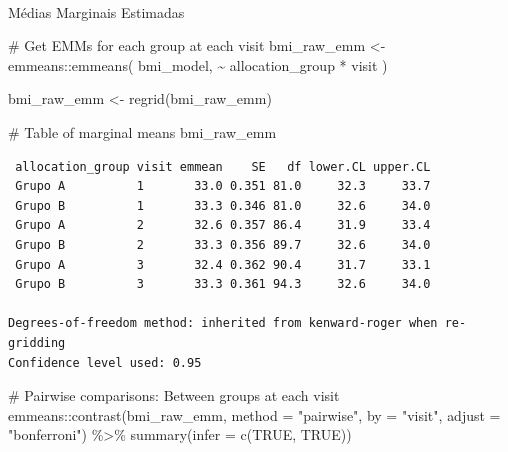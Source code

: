 \documentclass[
  letterpaper,
  DIV=11,
  numbers=noendperiod]{scrartcl}
\makeatletter
\let\oldparagraph\paragraph
\renewcommand{\paragraph}{
    \@ifstar
      \xxxParagraphStar
      \xxxParagraphNoStar
  }
\newcommand{\xxxParagraphStar}[1]{\oldparagraph*{#1}\mbox{}}
\newcommand{\xxxParagraphNoStar}[1]{\oldparagraph{#1}\mbox{}}
\newenvironment{Shaded}{\begin{snugshade}}{\end{snugshade}}
\newcommand{\AttributeTok}[1]{\textcolor[rgb]{0.40,0.45,0.13}{#1}}
\newcommand{\CommentTok}[1]{\textcolor[rgb]{0.37,0.37,0.37}{#1}}
\newcommand{\ConstantTok}[1]{\textcolor[rgb]{0.56,0.35,0.01}{#1}}
\newcommand{\FunctionTok}[1]{\textcolor[rgb]{0.28,0.35,0.67}{#1}}
\newcommand{\NormalTok}[1]{\textcolor[rgb]{0.00,0.23,0.31}{#1}}
\newcommand{\OtherTok}[1]{\textcolor[rgb]{0.00,0.23,0.31}{#1}}
\newcommand{\SpecialCharTok}[1]{\textcolor[rgb]{0.37,0.37,0.37}{#1}}
\newcommand{\StringTok}[1]{\textcolor[rgb]{0.13,0.47,0.30}{#1}}
\makeatother
\begin{document}
\paragraph{Médias Marginais
Estimadas}\label{muxe9dias-marginais-estimadas-14}

\begin{Shaded}
\begin{Highlighting}[]
\CommentTok{\# Get EMMs for each group at each visit}
\NormalTok{bmi\_raw\_emm }\OtherTok{\textless{}{-}}\NormalTok{ emmeans}\SpecialCharTok{::}\FunctionTok{emmeans}\NormalTok{(}
\NormalTok{    bmi\_model, }
    \SpecialCharTok{\textasciitilde{}}\NormalTok{ allocation\_group }\SpecialCharTok{*}\NormalTok{ visit}
\NormalTok{)}

\NormalTok{bmi\_raw\_emm }\OtherTok{\textless{}{-}} \FunctionTok{regrid}\NormalTok{(bmi\_raw\_emm)}

\CommentTok{\# Table of marginal means}
\NormalTok{bmi\_raw\_emm}
\end{Highlighting}
\end{Shaded}

\begin{verbatim}
 allocation_group visit emmean    SE   df lower.CL upper.CL
 Grupo A          1       33.0 0.351 81.0     32.3     33.7
 Grupo B          1       33.3 0.346 81.0     32.6     34.0
 Grupo A          2       32.6 0.357 86.4     31.9     33.4
 Grupo B          2       33.3 0.356 89.7     32.6     34.0
 Grupo A          3       32.4 0.362 90.4     31.7     33.1
 Grupo B          3       33.3 0.361 94.3     32.6     34.0

Degrees-of-freedom method: inherited from kenward-roger when re-gridding 
Confidence level used: 0.95 
\end{verbatim}

\begin{Shaded}
\begin{Highlighting}[]
\CommentTok{\# Pairwise comparisons: Between groups at each visit}
\NormalTok{emmeans}\SpecialCharTok{::}\FunctionTok{contrast}\NormalTok{(bmi\_raw\_emm, }\AttributeTok{method =} \StringTok{"pairwise"}\NormalTok{, }\AttributeTok{by =} \StringTok{"visit"}\NormalTok{, }\AttributeTok{adjust =} \StringTok{"bonferroni"}\NormalTok{) }\SpecialCharTok{\%\textgreater{}\%} \FunctionTok{summary}\NormalTok{(}\AttributeTok{infer =} \FunctionTok{c}\NormalTok{(}\ConstantTok{TRUE}\NormalTok{, }\ConstantTok{TRUE}\NormalTok{))}
\end{Highlighting}
\end{Shaded}
\end{document}
